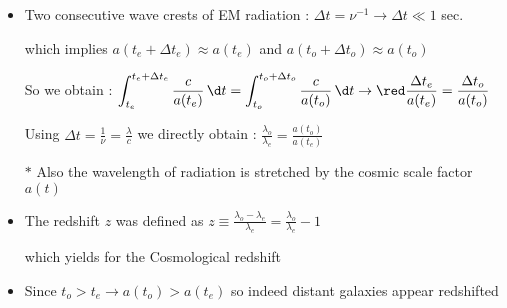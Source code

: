 \Tr
\begin{itemize}
\item Two consecutive wave crests of EM radiation : $\Delta t=\nu^{-1} \rightarrow \Delta t \ll 1$ sec.
\item[] which implies {\blue $a(t_{e}+\Delta t_{e}) \approx a(t_{e})$} and
        {\blue $a(t_{o}+\Delta t_{o}) \approx a(t_{o})$}
\item[] So we obtain : $\displaystyle \int_{t_{e}}^{t_{e}+\Delta t_{e}} \frac{c}{a(t_{e})}\,\d t =
        \int_{t_{o}}^{t_{o}+\Delta t_{o}} \frac{c}{a(t_{o})}\,\d t
        \rightarrow {\red \frac{\Delta t_{e}}{a(t_{e})}=\frac{\Delta t_{o}}{a(t_{o})}}$
\item[] Using $\displaystyle \Delta t=\frac{1}{\nu}=\frac{\lambda}{c}$ we directly obtain :
        {\blue $\displaystyle \frac{\lambda_{o}}{\lambda_{e}}=\frac{a(t_{o})}{a(t_{e})}$}
\item[$\ast$] {\blue Also the wavelength of radiation is stretched by the cosmic scale factor $a(t)$}
\item The redshift $z$ was defined as
      $\displaystyle z \equiv \frac{\lambda_{o}-\lambda_{e}}{\lambda_{e}}=\frac{\lambda_{o}}{\lambda_{e}}-1$
\item[] which yields for the {\blue Cosmological redshift}
\item[] \begin{center}
        {\red {}}
        \end{center}
\item Since $t_{o}>t_{e} \rightarrow a(t_{o})>a(t_{e})$ so indeed distant galaxies appear redshifted
\end{itemize}

